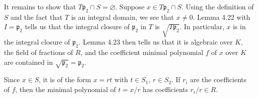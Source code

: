 It remains to show that $T \mathfrak{p}_2 \cap S = \varnothing$. Suppose
$x \in T \mathfrak{p}_2 \cap S$. Using the definition of $S$ and the fact that
$T$ is an integral domain, we see that $x\neq 0$. Lemma 4.22 with $I = \mathfrak{p}_2$
tells us that the integral closure of  $\mathfrak{p}_2$ in $T$ is $\sqrt{T \mathfrak{p}_2}$.
In particular, $x$ is in the integral closure of $\mathfrak{p}_2$. Lemma
4.23 then tells us that it is algebraic over $K$, the field of fractions of $R$,
and the coefficient minimal polynomial $f$ of $x$ over $K$ are contained
in $\sqrt{\mathfrak{p}_2} = \mathfrak{p}_2$.

Since $x \in S$, it is of the form $x=rt$ with $t \in S_1$, $r \in S_2$. If
$r_i$ are the coefficients of $f$, then the minimal polynomial of $t = x/r$ has
coefficients $r_i/r \in R$.
